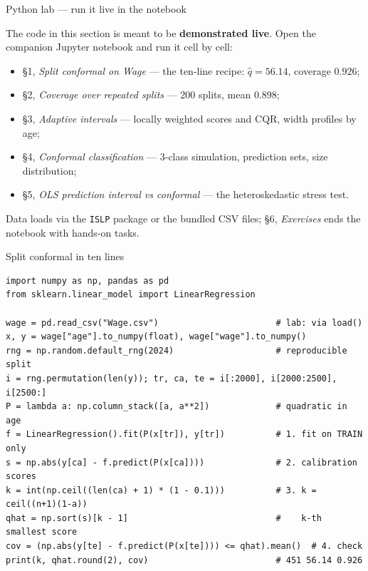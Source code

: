 \documentclass[aspectratio=169,11pt]{beamer}
\begin{document}
\begin{frame}{Python lab --- run it live in the notebook}
  \begin{labnote}
    The code in this section is meant to be \textbf{demonstrated live}. Open the
    companion Jupyter notebook and run it cell by cell:
    \begin{itemize}
      \item \S1, \emph{Split conformal on Wage} --- the ten-line recipe:
            $\hat q = 56.14$, coverage $0.926$;
      \item \S2, \emph{Coverage over repeated splits} --- 200 splits, mean $0.898$;
      \item \S3, \emph{Adaptive intervals} --- locally weighted scores and CQR,
            width profiles by age;
      \item \S4, \emph{Conformal classification} --- 3-class simulation, prediction
            sets, size distribution;
      \item \S5, \emph{OLS prediction interval vs conformal} --- the heteroskedastic
            stress test.
    \end{itemize}
    Data loads via the \texttt{ISLP} package or the bundled CSV files; \S6,
    \emph{Exercises} ends the notebook with hands-on tasks.
  \end{labnote}
\end{frame}

\begin{frame}[fragile]{Split conformal in ten lines}
  \begin{lstlisting}
import numpy as np, pandas as pd
from sklearn.linear_model import LinearRegression

wage = pd.read_csv("Wage.csv")                       # lab: via load()
x, y = wage["age"].to_numpy(float), wage["wage"].to_numpy()
rng = np.random.default_rng(2024)                    # reproducible split
i = rng.permutation(len(y)); tr, ca, te = i[:2000], i[2000:2500], i[2500:]
P = lambda a: np.column_stack([a, a**2])             # quadratic in age
f = LinearRegression().fit(P(x[tr]), y[tr])          # 1. fit on TRAIN only
s = np.abs(y[ca] - f.predict(P(x[ca])))              # 2. calibration scores
k = int(np.ceil((len(ca) + 1) * (1 - 0.1)))          # 3. k = ceil((n+1)(1-a))
qhat = np.sort(s)[k - 1]                             #    k-th smallest score
cov = (np.abs(y[te] - f.predict(P(x[te]))) <= qhat).mean()  # 4. check
print(k, qhat.round(2), cov)                         # 451 56.14 0.926
  \end{lstlisting}
\end{frame}
\end{document}
